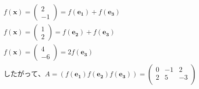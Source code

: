 \documentclass[dvipdfmx,uplatex]{jsarticle}
\begin{document}
  \begin{equation}
    \begin{aligned}
        &f(\bm{x})=\begin{pmatrix} 2\\ -1 \end{pmatrix} = f(\bm{e_{1}}) + f(\bm{e_{3}})\nonumber\\
        &f(\bm{x})=\begin{pmatrix} 1\\ 2 \end{pmatrix} = f(\bm{e_{2}}) + f(\bm{e_{3}})\nonumber\\
        &f(\bm{x})=\begin{pmatrix} 4\\ -6 \end{pmatrix} = 2f(\bm{e_{3}})\nonumber\\
        &したがって、A=\left( f(\bm{e_{1}}) f(\bm{e_{2}}) f(\bm{e_{3}}) \right) = \begin{pmatrix} 0 & -1 & 2\\ 2 & 5 & -3\\ \end{pmatrix}\nonumber\\
    \end{aligned}
  \end{equation}
\end{document}
